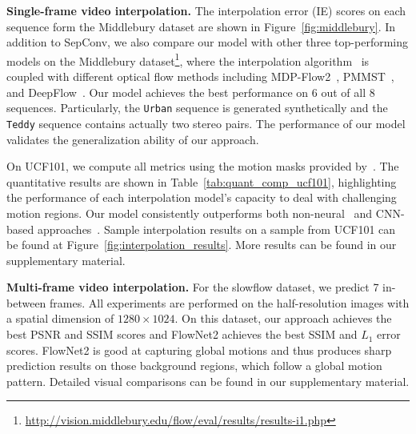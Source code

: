 \documentclass[10pt,twocolumn,letterpaper]{article}
\begin{document}
\begin{figure*}
\begin{tabular}{ccccccc}
\end{tabular}
\caption{Visual results of a sample from UCF101. Our model produces less artifacts around the brush and the hand (best viewed in color). Please see the supplementary material for more image and \emph{video} results. }
\label{fig:interpolation_results}
\end{figure*}

\noindent\textbf{Single-frame video interpolation.} The interpolation error (IE) scores on each sequence form the Middlebury dataset are shown in Figure~\ref{fig:middlebury}. In addition to SepConv, we also compare our model with other three top-performing models on the Middlebury dataset\footnote{\url{http://vision.middlebury.edu/flow/eval/results/results-i1.php}}, where the interpolation algorithm~\cite{baker11a} is coupled with different optical flow methods including MDP-Flow2~\cite{xu2012motion}, PMMST~\cite{pmmst}, and DeepFlow~\cite{deepflow}. Our model achieves the best performance on 6 out of all 8 sequences. Particularly, the \texttt{Urban} sequence is generated synthetically and the \texttt{Teddy} sequence contains actually two stereo pairs. The performance of our model validates the generalization ability of our approach.

On UCF101, we compute all metrics using the motion masks provided by~\cite{liu17video}. The quantitative results are shown in Table~\ref{tab:quant_comp_ucf101}, highlighting the performance of each interpolation model's capacity to deal with challenging motion regions. Our model consistently outperforms both non-neural~\cite{meyer15phase} and CNN-based approaches~\cite{niklaus17video_iccv,liu17video}. Sample interpolation results on a sample from UCF101 can be found at Figure~\ref{fig:interpolation_results}. More results can be found in our supplementary material.

\noindent\textbf{Multi-frame video interpolation.} For the slowflow dataset, we predict 7 in-between frames. All experiments are performed on the half-resolution images with a spatial dimension of $1280\times1024$. On this dataset, our approach achieves the best PSNR and SSIM scores and FlowNet2 achieves the best SSIM and $L_1$ error scores. FlowNet2 is good at capturing global motions and thus produces sharp prediction results on those background regions, which follow a global motion pattern. Detailed visual comparisons can be found in our supplementary material.
\end{document}

